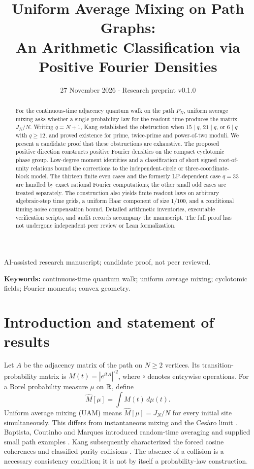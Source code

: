 \documentclass[11pt]{article}
\title{\vspace{-1.2em}\bfseries Uniform Average Mixing on Path Graphs:\\ An Arithmetic Classification via Positive Fourier Densities}
\author{}\date{27 November 2026 \quad $\cdot$ \quad Research preprint v0.1.0}
\begin{document}
\maketitle
\begin{center}\small AI-assisted research manuscript; candidate proof, not peer reviewed.\end{center}
\begin{abstract}
For the continuous-time adjacency quantum walk on the path $P_N$, uniform average mixing asks whether a single probability law for the readout time produces the matrix $J_N/N$. Writing $q=N+1$, Kang established the obstruction when $15\mid q$, $21\mid q$, or $6\mid q$ with $q\ge12$, and proved existence for prime, twice-prime and power-of-two moduli. We present a candidate proof that these obstructions are exhaustive. The proposed positive direction constructs positive Fourier densities on the compact cyclotomic phase group. Low-degree moment identities and a classification of short signed root-of-unity relations bound the corrections to the independent-circle or three-coordinate-block model. The thirteen finite even cases and the formerly LP-dependent case $q=33$ are handled by exact rational Fourier computations; the other small odd cases are treated separately. The construction also yields finite readout laws on arbitrary algebraic-step time grids, a uniform Haar component of size $1/100$, and a conditional timing-noise compensation bound. Detailed arithmetic inventories, executable verification scripts, and audit records accompany the manuscript. The full proof has not undergone independent peer review or Lean formalization.
\end{abstract}
\noindent\textbf{Keywords:} continuous-time quantum walk; uniform average mixing; cyclotomic fields; Fourier moments; convex geometry.\par
\section{Introduction and statement of results}
Let $A$ be the adjacency matrix of the path on $N\ge2$ vertices. Its transition-probability matrix is $M(t)=|e^{itA}|^{\circ 2}$, where $\circ$ denotes entrywise operations. For a Borel probability measure $\mu$ on $\mathbb R$, define
\begin{equation}\label{eq:mix} \widehat M[\mu]=\int M(t)\,d\mu(t).\end{equation}
Uniform average mixing (UAM) means $\widehat M[\mu]=J_N/N$ for every initial site simultaneously. This differs from instantaneous mixing and the Ces\`aro limit \cite{godsil}. Baptista, Coutinho and Marques introduced random-time averaging and supplied small path examples \cite{baptista}. Kang subsequently characterized the forced cosine coherences and classified parity collisions \cite{kang}. The absence of a collision is a necessary consistency condition; it is not by itself a probability-law construction.
\end{document}
